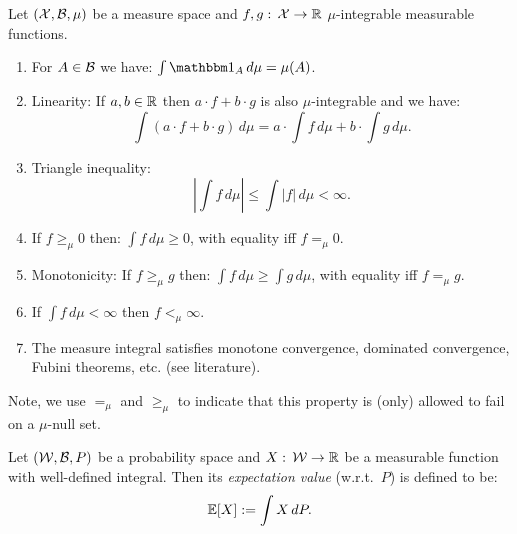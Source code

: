 \begin{Thm}
       Let $(\mathcal{X},\mathcal{B},\mu)$ be a measure space and $f,g:\,\mathcal{X} \to \mathbb{R}$ $\mu$-integrable measurable functions.
       \begin{enumerate}
           \item For $A \in \mathcal{B}$ we have: $\int \I_A\,d\mu = \mu(A)$.
           \item Linearity: %
               If $a,b \in \mathbb{R}$ then $a\cdot f+b\cdot g$ is also $\mu$-integrable and we have:
               \[ \int (a\cdot f+b\cdot g)\,d\mu = a\cdot \int f\, d\mu + b \cdot \int g\,d\mu.\]
           \item Triangle inequality: %
               \[\left|\int f\,d\mu\right| \le \int |f|\,d\mu < \infty.\]
           \item %
               If $f \ge_\mu 0$ then: $\int f\,d\mu \ge 0$, with equality iff $f =_\mu 0$.
           \item Monotonicity:  %
               If $f \ge_\mu g$ then: $\int f\,d\mu \ge \int g\,d\mu$, with equality iff $f=_\mu g$.
           \item If $\int f\,d\mu <\infty$ then $f<_\mu \infty$.
           \item The measure integral satisfies monotone convergence, dominated convergence, Fubini theorems, etc.  (see literature).
       \end{enumerate}
       Note, we use $=_\mu$ and $\ge_\mu$ to indicate that this property is (only) allowed to fail on a $\mu$-null set.
\end{Thm}


\begin{Def}
    Let $(\mathcal{W},\mathcal{B},P)$ be a probability space and $X:\, \mathcal{W} \to \mathbb{R}$ be a measurable function with well-defined integral.
    Then its \emph{expectation value} (w.r.t.\ $P$) is defined to be:
    \[ \mathbb{E}[X]: = \int X\,dP. \]
\end{Def}

